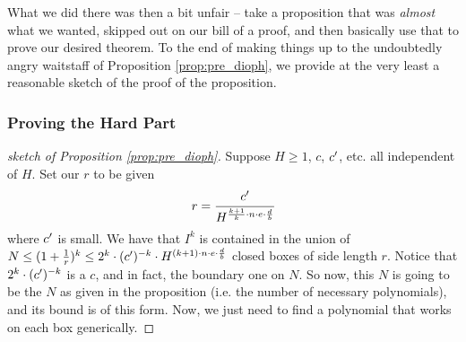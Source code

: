 What we did there was then a bit unfair -- take a proposition that was \emph{almost} what we wanted, skipped out on our bill of a proof, and then basically use that to prove our desired theorem. To the end of making things up to the undoubtedly angry waitstaff of Proposition \ref{prop:pre_dioph}, we provide at the very least a reasonable sketch of the proof of the proposition.

\subsubsection{Proving the Hard Part}

\begin{proof}[sketch of Proposition \ref{prop:pre_dioph}]
  Suppose $H \geq 1$, $c$, $c^{\prime}$, etc. all independent of $H$. Set our $r$ to be given
    \begin{align*}
      r = \cfrac{c^{\prime}}{H^{\frac{k + 1}{k} \cdot n \cdot e \cdot \frac{d}{b}}}
    \end{align*}
  where $c^{\prime}$ is small. We have that $I^k$ is contained in the union of $N \leq (1 + \frac{1}{r})^k \leq 2^k \cdot (c^{\prime})^{-k} \cdot H^{(k+1) \cdot n \cdot e \cdot \frac{d}{b}}$ closed boxes of side length $r$. Notice that $2^k \cdot (c^{\prime})^{-k}$ is a $c$, and in fact, the boundary one on $N$. So now, this $N$ is going to be the $N$ as given in the proposition (i.e. the number of necessary polynomials), and its bound is of this form. Now, we just need to find a polynomial that works on each box generically.


\end{proof}
